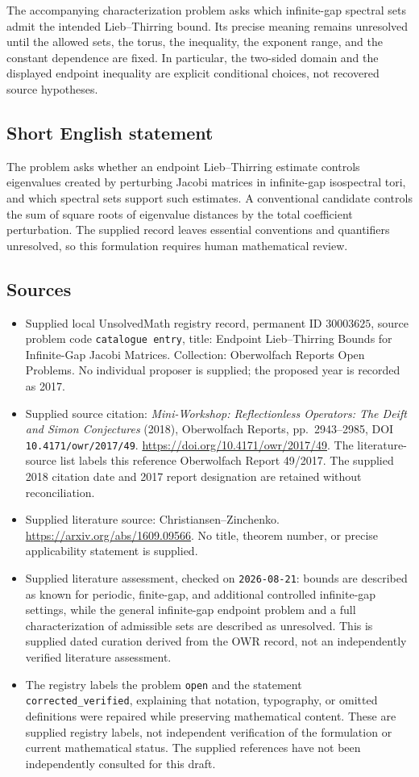 \documentclass[11pt]{article}
\begin{document}
The accompanying characterization problem asks which infinite-gap spectral sets admit the intended Lieb--Thirring bound. Its precise meaning remains unresolved until the allowed sets, the torus, the inequality, the exponent range, and the constant dependence are fixed. In particular, the two-sided domain and the displayed endpoint inequality are explicit conditional choices, not recovered source hypotheses.
\subsection{Short English statement}
The problem asks whether an endpoint Lieb--Thirring estimate controls eigenvalues created by perturbing Jacobi matrices in infinite-gap isospectral tori, and which spectral sets support such estimates. A conventional candidate controls the sum of square roots of eigenvalue distances by the total coefficient perturbation. The supplied record leaves essential conventions and quantifiers unresolved, so this formulation requires human mathematical review.
\subsection{Sources}
\begin{itemize}
\item Supplied local UnsolvedMath registry record, permanent ID \(30003625\), source problem code \texttt{catalogue entry}, title: Endpoint Lieb--Thirring Bounds for Infinite-Gap Jacobi Matrices. Collection: Oberwolfach Reports Open Problems. No individual proposer is supplied; the proposed year is recorded as 2017.
\item Supplied source citation: \emph{Mini-Workshop: Reflectionless Operators: The Deift and Simon Conjectures} (2018), Oberwolfach Reports, pp.\ 2943--2985, DOI \texttt{10.4171/owr/2017/49}. \url{https://doi.org/10.4171/owr/2017/49}. The literature-source list labels this reference Oberwolfach Report 49/2017. The supplied 2018 citation date and 2017 report designation are retained without reconciliation.
\item Supplied literature source: Christiansen--Zinchenko. \url{https://arxiv.org/abs/1609.09566}. No title, theorem number, or precise applicability statement is supplied.
\item Supplied literature assessment, checked on \texttt{2026-08-21}: bounds are described as known for periodic, finite-gap, and additional controlled infinite-gap settings, while the general infinite-gap endpoint problem and a full characterization of admissible sets are described as unresolved. This is supplied dated curation derived from the OWR record, not an independently verified literature assessment.
\item The registry labels the problem \texttt{open} and the statement \texttt{corrected\_verified}, explaining that notation, typography, or omitted definitions were repaired while preserving mathematical content. These are supplied registry labels, not independent verification of the formulation or current mathematical status. The supplied references have not been independently consulted for this draft.
\end{itemize}
\end{document}
